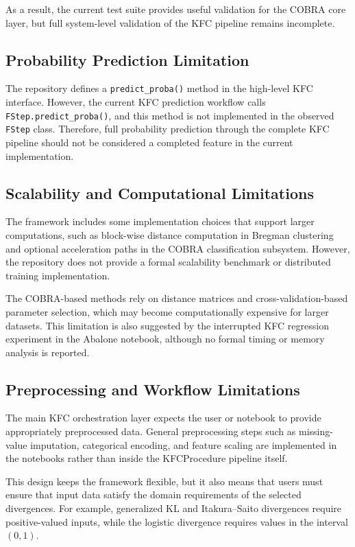 As a result, the current test suite provides useful validation for the COBRA core layer, but full system-level validation of the KFC pipeline remains incomplete.

\subsection{Probability Prediction Limitation}

The repository defines a \texttt{predict\_proba()} method in the high-level KFC interface. However, the current KFC prediction workflow calls \texttt{FStep.predict\_proba()}, and this method is not implemented in the observed \texttt{FStep} class. Therefore, full probability prediction through the complete KFC pipeline should not be considered a completed feature in the current implementation.

\subsection{Scalability and Computational Limitations}

The framework includes some implementation choices that support larger computations, such as block-wise distance computation in Bregman clustering and optional acceleration paths in the COBRA classification subsystem. However, the repository does not provide a formal scalability benchmark or distributed training implementation.

The COBRA-based methods rely on distance matrices and cross-validation-based parameter selection, which may become computationally expensive for larger datasets. This limitation is also suggested by the interrupted KFC regression experiment in the Abalone notebook, although no formal timing or memory analysis is reported.

\subsection{Preprocessing and Workflow Limitations}

The main KFC orchestration layer expects the user or notebook to provide appropriately preprocessed data. General preprocessing steps such as missing-value imputation, categorical encoding, and feature scaling are implemented in the notebooks rather than inside the KFCProcedure pipeline itself.

This design keeps the framework flexible, but it also means that users must ensure that input data satisfy the domain requirements of the selected divergences. For example, generalized KL and Itakura--Saito divergences require positive-valued inputs, while the logistic divergence requires values in the interval $(0,1)$.

